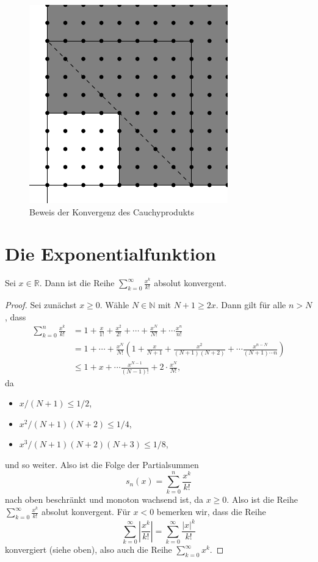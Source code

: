 \documentclass[../main.tex]{subfiles}
\begin{document}
\begin{figure}[htb]
  \centering
  \includegraphics{chapter2/images/cauchy-thm}
  \caption{Beweis der Konvergenz des Cauchyprodukts}%
  \label{fig:cauchy-proof}
\end{figure}

\section{Die Exponentialfunktion}
\begin{lemma*}
  Sei $x \in \mathbb{R}$. Dann ist die Reihe
  $\sum_{k=0}^{\infty} \frac{x^k}{k!}$ absolut konvergent.
\end{lemma*}

\begin{proof}
  Sei zunächst $x \geq 0$. Wähle $N \in \mathbb{N}$ mit
  $N+ 1 \geq 2x$.
  Dann gilt für alle $n > N$, dass
  \begin{align*}
    \sum_{k=0}^{n} \frac{x^k}{k!}    & 
    = 1 + \frac{x}{1!} + \frac{x^2}{2!} + \cdots
    + \frac{x^N}{N!} + \cdots \frac{x^n}{n!} \\ &
    = 1 + \cdots + \frac{x^N}{N!}
    \left( 1 + \frac{x}{N+1} + \frac{x^2}{(N+1)(N+2)}
  + \cdots \frac{x^{n-N}}{(N+1) \cdots n}\right)\\ &
    \leq 1 + x + \cdots \frac{x^{N-1}}{(N-1)!} + 2 \cdot
    \frac{x^N}{N!},
  \end{align*}
  da
  \begin{itemize}
    \item $x/(N+1) \leq 1/2$,
    \item $x^2/(N+1)(N+2) \leq 1/4$,
    \item $x^3/(N+1)(N+2)(N+3) \leq 1/8$,
  \end{itemize}
  und so weiter.
  Also ist die Folge der Partialsummen
  \[
    s_n(x) = \sum_{k=0}^{n} \frac{x^k}{k!}
  \]
  nach oben beschränkt und monoton wachsend ist, da $x \geq 0$.
  Also ist die Reihe
  $\sum_{k=0}^{\infty} \frac{x^k}{k!}$ absolut konvergent.
  Für $x < 0$ bemerken wir,
  dass die Reihe
  \[
    \sum_{k=0}^{\infty} \left| \frac{x^k}{k!} \right|
    = \sum_{k=0}^{\infty} \frac{|x|^k}{k!}
  \]
  konvergiert (siehe oben), also auch die Reihe
  $\sum_{k=0}^{\infty} x^k$.
\end{proof}
\end{document}
